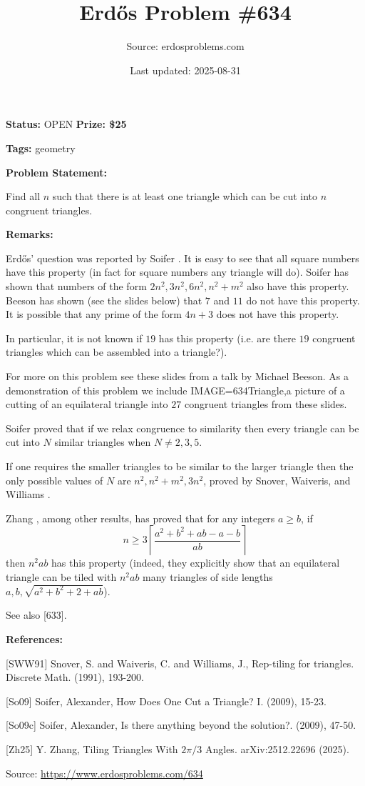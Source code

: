 \documentclass{article}
\title{Erd\H{o}s Problem \#634}
\date{Last updated: 2025-08-31}
\author{Source: erdosproblems.com}
\begin{document}
\maketitle

\noindent\textbf{Status:} OPEN \quad \textbf{Prize: \$25}

\noindent\textbf{Tags:} geometry

\medskip
\noindent\textbf{Problem Statement:}

Find all $n$ such that there is at least one triangle which can be cut into $n$ congruent triangles.

\bigskip
\noindent\textbf{Remarks:}

Erd\H{o}s' question was reported by Soifer \cite{So09c}. It is easy to see that all square numbers have this property (in fact for square numbers any triangle will do). Soifer \cite{So09c} has shown that numbers of the form $2n^2,3n^2,6n^2,n^2+m^2$ also have this property. Beeson has shown (see the slides below) that $7$ and $11$ do not have this property. It is possible that any prime of the form $4n+3$ does not have this property.

In particular, it is not known if $19$ has this property (i.e. are there $19$ congruent triangles which can be assembled into a triangle?).

For more on this problem see these slides from a talk by Michael Beeson. As a demonstration of this problem we include {IMAGE=634Triangle,a picture} of a cutting of an equilateral triangle into $27$ congruent triangles from these slides.

Soifer proved \cite{So09} that if we relax congruence to similarity then every triangle can be cut into $N$ similar triangles when $N\neq 2,3,5$.

If one requires the smaller triangles to be similar to the larger triangle then the only possible values of $N$ are $n^2,n^2+m^2,3n^2$, proved by Snover, Waiveris, and Williams \cite{SWW91}.

Zhang \cite{Zh25}, among other results, has proved that for any integers $a \geq b$, if\[n\geq 3\left\lceil \frac{a^2+b^2+ab-a-b}{ab}\right\rceil\]then $n^2ab$ has this property (indeed, they explicitly show that an equilateral triangle can be tiled with $n^2ab$ many triangles of side lengths $a,b,\sqrt{a^2+b^2+2+ab}$).

See also [633].

\bigskip
\noindent\textbf{References:}

[SWW91] Snover, S. and Waiveris, C. and Williams, J., Rep-tiling for triangles. Discrete Math. (1991), 193-200.
 
 [So09] Soifer, Alexander, How Does One Cut a Triangle? I. (2009), 15-23.
 
 [So09c] Soifer, Alexander, Is there anything beyond the solution?. (2009), 47-50.
 
 [Zh25] Y. Zhang, Tiling Triangles With $2\pi/3$ Angles. arXiv:2512.22696 (2025).

\bigskip
\noindent\small{Source: \url{https://www.erdosproblems.com/634}}
\end{document}
